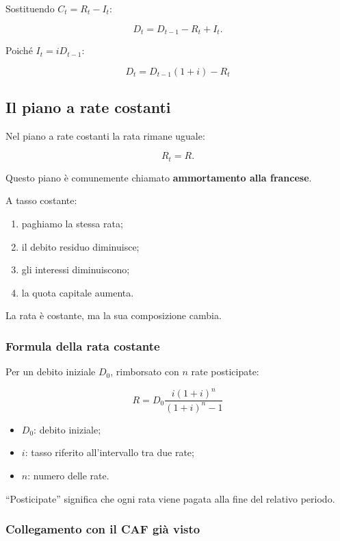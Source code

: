 \noindent Sostituendo
$C_t=R_t-I_t$:

\[
D_t=D_{t-1}-R_t+I_t.
\]

\noindent Poiché $I_t=iD_{t-1}$:

\[
\boxed{
D_t=D_{t-1}(1+i)-R_t
}
\]


\subsection{Il piano a rate costanti}

\noindent Nel piano a rate costanti
la rata rimane uguale:

\[
R_t=R.
\]

\noindent Questo piano è comunemente chiamato
\textbf{ammortamento alla francese}.

\noindent A tasso costante:

\begin{enumerate}
    \item paghiamo la stessa rata;
    \item il debito residuo diminuisce;
    \item gli interessi diminuiscono;
    \item la quota capitale aumenta.
\end{enumerate}

\noindent La rata è costante,
ma la sua composizione cambia.


\subsubsection*{Formula della rata costante}

\noindent Per un debito iniziale $D_0$,
rimborsato con $n$ rate posticipate:

\[
\boxed{
R=
D_0
\frac{i(1+i)^n}
{(1+i)^n-1}
}
\]

\begin{itemize}
    \item $D_0$: debito iniziale;
    \item $i$: tasso riferito
    all'intervallo tra due rate;
    \item $n$: numero delle rate.
\end{itemize}

\noindent ``Posticipate'' significa
che ogni rata viene pagata
alla fine del relativo periodo.


\subsubsection*{Collegamento con il CAF già visto}

